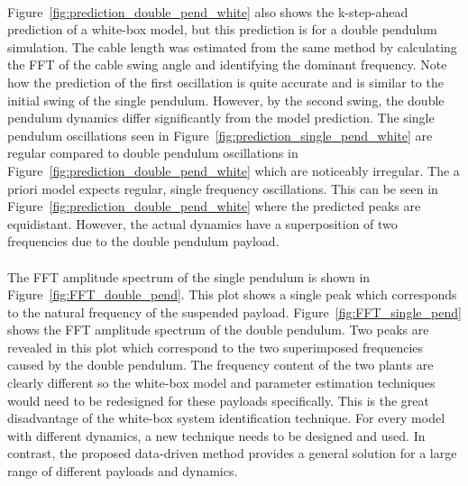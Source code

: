         
        
        \paragraph{}
        Figure~\ref{fig:prediction_double_pend_white} also shows the k-step-ahead prediction 
        of a white-box model, but this prediction is for a double pendulum simulation.
        The cable length was estimated from the same method 
        by calculating the FFT of the cable swing angle and identifying the dominant frequency.
        Note how the prediction of the first oscillation is quite accurate and is similar to the initial swing of the single pendulum.
        However, by the second swing, the double pendulum dynamics differ significantly from the model prediction.
        The single pendulum oscillations seen in Figure~\ref{fig:prediction_single_pend_white} are regular
        compared to double pendulum oscillations in Figure~\ref{fig:prediction_double_pend_white} which are noticeably irregular.
        The a priori model expects regular, single frequency oscillations.
        This can be seen in Figure~\ref{fig:prediction_double_pend_white} where the predicted peaks are equidistant.
        However, the actual dynamics have a superposition of two frequencies due to the double pendulum payload.

        
        
        \paragraph{}
        The FFT amplitude spectrum of the single pendulum is shown in Figure~\ref{fig:FFT_double_pend}.
        This plot shows a single peak which corresponds to the natural frequency of the suspended payload.
        Figure~\ref{fig:FFT_single_pend} shows the FFT amplitude spectrum of the double pendulum.
        Two peaks are revealed in this plot 
        which correspond to the two superimposed frequencies caused by the double pendulum.
        The frequency content of the two plants are clearly different 
        so the white-box model and parameter estimation techniques would need to be redesigned for these payloads specifically.
        This is the great disadvantage of the white-box system identification technique.
        For every model with different dynamics, a new technique needs to be designed and used.
        In contrast, the proposed data-driven method provides a general solution 
        for a large range of different payloads and dynamics.

